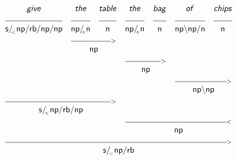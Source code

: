 \documentclass{article}
\newcommand{\deriv}[2]
{  \renewcommand{\arraystretch}{.5}
$\begin{array}[t]{*{#1}{c}}
     #2
   \end{array}$ }
\newcommand{\gf}[1]{\textsf{\textsl{#1}}}
\newcommand{\cf}[1]{\mbox{\ensuremath{\cfont{#1}}}}
\newcommand{\uline}[1]
{\mc{#1}{\hrulefill} }
\newcommand{\mc}[2]
  {\multicolumn{#1}{c}{#2}}
\newcommand{\cfont}{\mathsf}
\newcommand{\bs}{\backslash}
\newcommand{\subsa}[1]{\hspace{-0.75mm}_{_{#1}}}
\begin{document}
\deriv{7}{
\gf{give} & \gf{the} & \gf{table} & \gf{the} & \gf{bag} & \gf{of} & \gf{chips} \\
\uline{1} & \uline{1} & \uline{1} & \uline{1} & \uline{1} & \uline{1} & \uline{1} \\
\cf{s/ \subsa{<} np/ rb/ np/ np} & \cf{np/ \subsa{\diamond} n} & \cf{n} & \cf{np/ \subsa{\diamond} n} & \cf{n} & \cf{np\bs np/ n} & \cf{n} \\
& \mc{2} {\hrulefill_{>}} \\
& \mc{2}{\cf{np}} \\
&&& \mc{2} {\hrulefill_{>}} \\
&&& \mc{2}{\cf{np}} \\
&&&&& \mc{2} {\hrulefill_{>}} \\
&&&&& \mc{2}{\cf{np\bs np}} \\
 \mc{3} {\hrulefill_{>}} \\
 \mc{3}{\cf{s/ \subsa{<} np/ rb/ np}} \\
&&& \mc{4} {\hrulefill_{<}} \\
&&& \mc{4}{\cf{np}} \\
 \mc{7} {\hrulefill_{>}} \\
 \mc{7}{\cf{s/ \subsa{<} np/ rb}} \\
}

\vspace{5mm}
\end{document}
